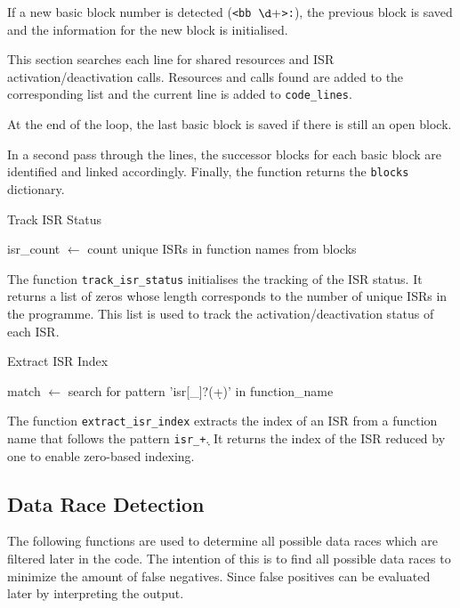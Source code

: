 \documentclass[
fancyheadings, %
%
%
]{stsreprt}
\begin{document}
{If a new basic block number is detected (\texttt{<bb \(\d+\)>:}), the previous block is saved and the information for the new block is initialised.

This section searches each line for shared resources and ISR activation/deactivation calls. Resources and calls found are added to the corresponding list and the current line is added to \texttt{code\_lines}.

At the end of the loop, the last basic block is saved if there is still an open block.

In a second pass through the lines, the successor blocks for each basic block are identified and linked accordingly. Finally, the function returns the \texttt{blocks} dictionary.

\begin{algorithm}[H]
	\caption{Track ISR Status}
	\DontPrintSemicolon
	\SetAlgoLined
	\BlankLine
	isr\_count $\gets$ count unique ISRs in function names from blocks\;
\end{algorithm}

The function \texttt{track\_isr\_status} initialises the tracking of the ISR status. It returns a list of zeros whose length corresponds to the number of unique ISRs in the programme. This list is used to track the activation/deactivation status of each ISR.

\begin{algorithm}[H]
	\caption{Extract ISR Index}
	\DontPrintSemicolon
	\SetAlgoLined
	\BlankLine
	match $\gets$ search for pattern 'isr[\_]?(\d+)' in function\_name\;
\end{algorithm}

The function \texttt{extract\_isr\_index} extracts the index of an ISR from a function name that follows the pattern \texttt{isr\_\d+}. It returns the index of the ISR reduced by one to enable zero-based indexing.

\subsection*{Data Race Detection}
The following functions are used to determine all possible data races which are filtered later in the code. The intention of this is to find all possible data races to minimize the amount of false negatives. Since false positives can be evaluated later by interpreting the output.

}
\end{document}
